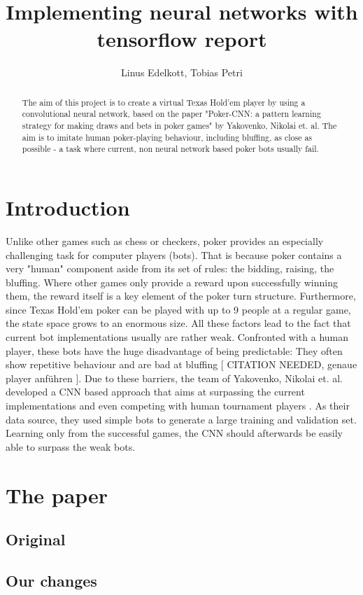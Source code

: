 \documentclass[]{report}
\title{Implementing neural networks with tensorflow report}
\author{Linus Edelkott, Tobias Petri}
\begin{document}
\maketitle

\begin{abstract}
The aim of this project is to create a virtual Texas Hold'em player by using a convolutional neural network, based on the paper "Poker-CNN: a pattern learning strategy for making draws and bets in poker games" \cite{1} by Yakovenko, Nikolai et. al.
The aim is to imitate human poker-playing behaviour, including bluffing, as close as possible - a task where current, non neural network based poker bots usually fail.
\end{abstract}


\section{Introduction}
Unlike other games such as chess or checkers, poker provides an especially challenging task for computer players (bots). That is because poker contains a very "human" component aside from its set of rules: the bidding, raising, the bluffing. Where other games only provide a reward upon successfully winning them, the reward itself is a key element of the poker turn structure. Furthermore, since Texas Hold'em poker can be played with up to 9 people at a regular game, the state space grows to an enormous size. All these factors lead to the fact that current bot implementations usually are rather weak. Confronted with a human player, these bots have the huge disadvantage of being predictable: They often show repetitive behaviour and are bad at bluffing [ CITATION NEEDED, genaue player anführen ]. Due to these barriers, the team of Yakovenko, Nikolai et. al. developed a CNN based approach that aims at surpassing the current implementations and even competing with human tournament players \cite{1}. As their data source, they used simple bots to generate a large training and validation set. Learning only from the successful games, the CNN should afterwards be easily able to surpass the weak bots.    

\section{The paper}
\subsection{Original}
\subsection{Our changes}
\end{document}
